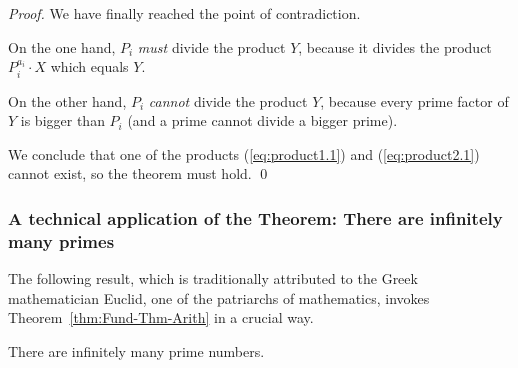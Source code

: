 \begin{proof}
We have finally reached the point of contradiction.

On the one hand, $P_i$ {\em must} divide the product $Y$, because it
divides the product $P_i^{a_i} \cdot X$ which equals $Y$.

On the other hand, $P_i$ {\em cannot} divide the product $Y$, because
every prime factor of $Y$ is bigger than $P_i$ (and a prime cannot
divide a bigger prime).

We conclude that one of the products (\ref{eq:product1.1}) and
(\ref{eq:product2.1}) cannot exist, so the theorem must hold.  \qed
\end{proof}



\subsubsection{A technical application of the Theorem: There are
  infinitely many primes}
\label{sec:infinite-primes}

The following result, which is traditionally attributed to the Greek
mathematician Euclid,  one of the patriarchs of
mathematics, invokes Theorem~\ref{thm:Fund-Thm-Arith} in a crucial
way.

\begin{prop}
\label{thm:infinite-primes}
There are infinitely many prime numbers.
\end{prop}


